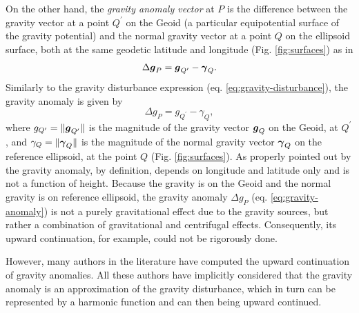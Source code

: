 \documentclass[extra]{gji}
\begin{document}
On the other hand, the \textit{gravity anomaly vector} at $P$ 
is the difference between the gravity
vector at a point $Q^{\prime}$ on the Geoid (a particular
equipotential surface of the gravity potential) and the normal
gravity vector at a point $Q$ on the ellipsoid surface, both at the
same geodetic latitude and longitude (Fig. \ref{fig:surfaces}) as in
\begin{equation}
\Delta \mitbf{g}_{P} = \mitbf{g}_{Q^{\prime}} - \mitbf{\gamma}_{Q} .
\label{eq:gravity-anomaly-vector}
\end{equation}
Similarly to the gravity disturbance expression (eq.
\ref{eq:gravity-disturbance}), the gravity anomaly is given by
\begin{equation}
\Delta g_{P} = g_{Q^{\prime}} - \gamma_{Q} ,
\label{eq:gravity-anomaly}
\end{equation}
where $g_{Q^{\prime} } = \| \mitbf{g}_{Q^{\prime}} \|$ is
the magnitude of the gravity vector $\mitbf{g}_{Q}$ on the Geoid,
at $Q^{\prime}$, and $\gamma_{Q} = \| \mitbf{\gamma}_{Q} \|$ is the 
magnitude of the normal gravity vector $\mitbf{\gamma}_{Q}$ 
on the reference ellipsoid, at the point $Q$ (Fig. \ref{fig:surfaces}).
As properly pointed out by \citet{barthelmes2013} the gravity anomaly,
by definition, depends on 
longitude and latitude only and is not a function of height. 
Because the gravity is on the Geoid and the normal gravity 
is on reference ellipsoid, the gravity anomaly $\Delta g_{P}$ 
(eq. \ref{eq:gravity-anomaly}) is not a purely gravitational effect 
due to the gravity sources, but rather a combination of gravitational 
and centrifugal effects. Consequently, its upward continuation, 
for example, could not be rigorously done. 

However, many authors in the literature have computed the upward 
continuation of gravity anomalies. All these authors have
implicitly considered that the gravity anomaly is an approximation of 
the gravity disturbance, which in turn can be represented by a 
harmonic function and can then being upward continued.
\end{document}
